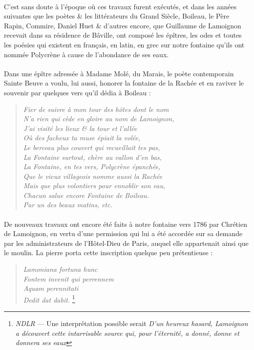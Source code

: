 \documentclass[../eBook.tex]{subfiles}
\begin{document}
      \paragraph{}C'est sans doute à l'époque où ces travaux furent exécutés, et dans les années suivantes que les poètes \& les littérateurs du Grand Siècle, Boileau, le Père Rapin, Commire, Daniel Huet \& d'autres encore, que Guillaume de Lamoignon recevait dans sa résidence de Bâville, ont composé les épîtres, les odes et toutes les poésies qui existent en français, en latin, en grec sur notre fontaine qu'ils ont nommée Polycrène à cause de l'abondance de ses eaux.
      \paragraph{}Dans une épître adressée à Madame Molé, du Marais, le poète contemporain Sainte Beuve a voulu, lui aussi, honorer la fontaine de la Rachée et en raviver le souvenir par quelques vers qu'il dédia à Boileau :
      \begin{quote}
        \og \textit{Fier de suivre à mon tour des hôtes dont le nom\\
        N'a rien qui cède en gloire au nom de Lamoignon,\\
        J'ai visité les lieux \& la tour et l'allée\\
        Où des facheux ta muse épiait la volée,\\
        Le berceau plus couvert qui recueillait tes pas,\\
        La Fontaine surtout, chère au vallon d'en bas,\\
        La Fontaine, en tes vers, Polycrène épanchée,\\
        Que le vieux villageois nomme aussi la Rachée\\
        Mais que plus volontiers pour ennoblir son eau,\\
        Chacun salue encore Fontaine de Boileau.\\
        Par un des beaux matins, etc.}\fg{}
      \end{quote}
      \paragraph{}De nouveaux travaux ont encore été faits à notre fontaine vers 1786 par Chrétien de Lamoignon, en vertu d'une permission qui lui a été accordée sur sa demande par les administrateurs de l'Hôtel-Dieu de Paris, auquel elle appartenait ainsi que le moulin. La pierre porta cette inscription quelque peu prétentieuse :
      \begin{quote}
        \og \textit{Lamoniana fortuna hunc\\
        Fontem invenit qui perrennem\\
        Aquam perennitati\\
        Dedit dat dabit. \fg{}}\footnote{\textit{NDLR} --- Une interprétation possible serait \og \textit{D'un heureux hasard, Lamoignon a découvert cette intarrisable source qui, pour l'éternité, a donné, donne et donnera ses eaux}}\fg{}
      \end{quote}
\end{document}
